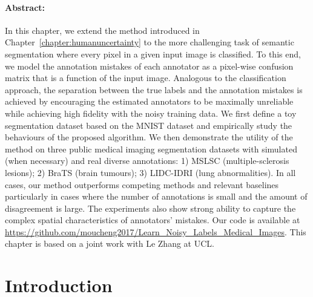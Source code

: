 \paragraph{Abstract: }
In this chapter, we extend the method introduced in Chapter~\ref{chapter:humanuncertainty} to the more challenging task of semantic segmentation where every pixel in a given input image is classified. To this end, we model the annotation mistakes of each annotator as a pixel-wise confusion matrix that is a function of the input image. Analogous to the classification approach, the separation between the true labels and the annotation mistakes is achieved by encouraging the estimated annotators to be maximally unreliable while achieving high fidelity with the noisy training data. We first define a toy segmentation dataset based on the MNIST dataset and empirically study the behaviours of the proposed algorithm. We then demonstrate the utility of the method on three public medical imaging segmentation datasets with simulated (when necessary) and real diverse annotations: 1) MSLSC (multiple-sclerosis lesions); 2) BraTS (brain tumours); 3) LIDC-IDRI (lung abnormalities). In all cases, our method outperforms competing methods and relevant baselines particularly in cases where the number of annotations is small and the amount of disagreement is large. The experiments also show strong ability to capture the complex spatial characteristics of annotators' mistakes. Our code is available at \url{https://github.com/moucheng2017/Learn_Noisy_Labels_Medical_Images}. This chapter is based on a joint work \cite{zhang2020disentangling} with Le Zhang at UCL. 


\section{Introduction}



